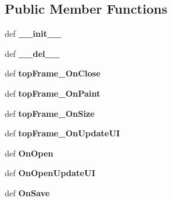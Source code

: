 \subsection*{Public Member Functions}
\begin{DoxyCompactItemize}
\item 
\hypertarget{classtop_frame_1_1_top_frame_aef31eddf36a67e6d7acf46e74c0d798e}{def {\bfseries \-\_\-\-\_\-init\-\_\-\-\_\-}}\label{classtop_frame_1_1_top_frame_aef31eddf36a67e6d7acf46e74c0d798e}

\item 
\hypertarget{classtop_frame_1_1_top_frame_a382284d24a1fc872d6fd991ba453efc6}{def {\bfseries \-\_\-\-\_\-del\-\_\-\-\_\-}}\label{classtop_frame_1_1_top_frame_a382284d24a1fc872d6fd991ba453efc6}

\item 
\hypertarget{classtop_frame_1_1_top_frame_afd791a7462b1b8bc8c125c67c26d919f}{def {\bfseries top\-Frame\-\_\-\-On\-Close}}\label{classtop_frame_1_1_top_frame_afd791a7462b1b8bc8c125c67c26d919f}

\item 
\hypertarget{classtop_frame_1_1_top_frame_ab015d357a61e776a6706216e3d753dc9}{def {\bfseries top\-Frame\-\_\-\-On\-Paint}}\label{classtop_frame_1_1_top_frame_ab015d357a61e776a6706216e3d753dc9}

\item 
\hypertarget{classtop_frame_1_1_top_frame_aa248a2960760ffce8c20ee7f31a48338}{def {\bfseries top\-Frame\-\_\-\-On\-Size}}\label{classtop_frame_1_1_top_frame_aa248a2960760ffce8c20ee7f31a48338}

\item 
\hypertarget{classtop_frame_1_1_top_frame_aed3ffbcf897fa6ef9af91fa7d0f528c5}{def {\bfseries top\-Frame\-\_\-\-On\-Update\-U\-I}}\label{classtop_frame_1_1_top_frame_aed3ffbcf897fa6ef9af91fa7d0f528c5}

\item 
\hypertarget{classtop_frame_1_1_top_frame_a6db43140ce7c8819a85c4b71d2d39372}{def {\bfseries On\-Open}}\label{classtop_frame_1_1_top_frame_a6db43140ce7c8819a85c4b71d2d39372}

\item 
\hypertarget{classtop_frame_1_1_top_frame_a8a220b7e04fb0e52ff5f847d52198490}{def {\bfseries On\-Open\-Update\-U\-I}}\label{classtop_frame_1_1_top_frame_a8a220b7e04fb0e52ff5f847d52198490}

\item 
\hypertarget{classtop_frame_1_1_top_frame_a3bf119c8b63122fa7bb768d89d1da19e}{def {\bfseries On\-Save}}\label{classtop_frame_1_1_top_frame_a3bf119c8b63122fa7bb768d89d1da19e}


\end{DoxyCompactItemize}
